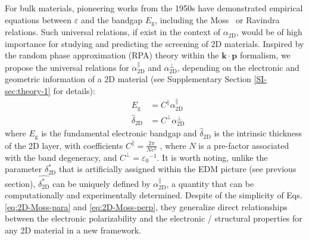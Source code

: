 For bulk materials, pioneering works from the 1950s have demonstrated
empirical equations between $\varepsilon$ and the bandgap
$E_{\mathrm{g}}$, including the
Moss~\cite{Moss_1950_relation,Moss_1985_n_Eg,Finkenrath_1988} or
Ravindra~\cite{Ravindra_1980_model,Ravindra_1979_eps_Eg} relations.
Such universal relations, if exist in the context of
$\alpha_{\mathrm{2D}}$, would be of high importance for studying and
predicting the screening of 2D materials.  Inspired by the random
phase approximation (RPA) theory \cite{Adler_1962} within the
$\mathbf{k} \cdot \mathbf{p}$
formalism\cite{kittel_2005_introduction,Jiang_2017_Eg_Eb}, we propose the universal relations for $\alpha_{\mathrm{2D}}^{\parallel}$ and $\alpha_{\mathrm{2D}}^{\perp}$,
depending on the electronic and geometric information of a 2D material (see
Supplementary Section \ref{SI-sec:theory-1} for details):
\begin{subequations}
\begin{eqnarray}
\label{eq:2D-Moss-para}
  &E_{\mathrm{g}} &= C^{\parallel} \alpha_{\mathrm{2D}}^{\parallel} \\
  \label{eq:2D-Moss-perp}
  &\hat{\delta}_{\mathrm{2D}} & = C^{\perp} \alpha_{\mathrm{2D}}^{\perp} 
\end{eqnarray}
\end{subequations}
where $E_{\mathrm{g}}$ is the fundamental electronic bandgap and
$\hat{\delta}_{\mathrm{2D}}$ is the intrinsic thickness of the 2D
layer, with coefficients
$C^{\parallel} = {\displaystyle \frac{2 \pi}{Ne^2}}$
\cite{Jiang_2017_Eg_Eb}, where $N$ is a pre-factor associated with the
band degeneracy, and $C^{\perp} = {\varepsilon_{0}}^{-1}$. It is worth
noting, unlike the parameter $\delta^{*}_{\mathrm{2D}}$ that is
artificially assigned within the EDM picture (see previous section),
$\hat{\delta^{*}_{\mathrm{2D}}}$ can be uniquely defined by
$\alpha_{\mathrm{2D}}^{\parallel}$, a quantity that can be
computationally and experimentally determined. Despite of the
simplicity of Eqs. \ref{eq:2D-Moss-para} and \ref{eq:2D-Moss-perp},
they generalize direct relationships between the electronic polarizability and
the electronic / structural properties for any 2D material in a new
framework.


